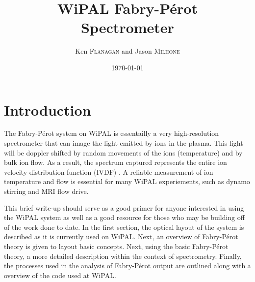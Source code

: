 \documentclass{article}
\title{WiPAL Fabry-P\'{e}rot\\ Spectrometer} %
\author{Ken \textsc{Flanagan} and Jason \textsc{Milhone}} %
\date{\today} %
\begin{document}
\maketitle %




\section*{Introduction}

The Fabry-P\'{e}rot system on WiPAL is essentailly a very high-resolution spectrometer that can image the light emitted by ions in the plasma. This light will be doppler shifted by random movements of the ions (temperature) and by bulk ion flow. As a result, the spectrum captured represents the entire ion velocity distribution function (IVDF) . A reliable measurement of ion temperature and flow is essential for many WiPAL experiements,  such as dynamo stirring and MRI flow drive.

This brief write-up should serve as a good primer for anyone interested in using the WiPAL system as well as a good resource for those who may be building off of the work done to date.  In the first section, the optical layout of the system is described as it is currently used on WiPAL. Next, an overview of Fabry-P\'{e}rot theory is given to layout basic concepts. Next, using the basic Fabry-P\'{e}rot theory, a more detailed description within the context of spectrometry. Finally, the processes used in the analysis of Fabry-P\'{e}rot output are outlined along with a overview of the code used at WiPAL.

\end{document}
